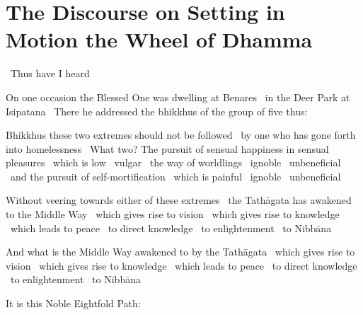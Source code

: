 \section{The Discourse on Setting in Motion the Wheel of Dhamma}
\label{wheel-of-dhamma-full}

\begin{leader-english}
  \anglebracketleft\ \hspace{-0.5mm}Thus have I heard \hspace{-0.5mm}\anglebracketright\
\end{leader-english}

\begin{english-only-hang}
  On one occasion the Blessed One was dwelling at Benares \breathmark\ in the Deer Park at Isipatana \breathmark\ There he addressed the bhikkhus of the group of five thus:
\end{english-only-hang}

\begin{english-only-hang}
  Bhikkhus these two extremes should not be followed \breathmark\ by one who has gone forth into homelessness \breathmark\ What two? The pursuit of sensual happiness in sensual pleasures \breathmark\ which is low \breathmark\ vulgar \breathmark\ the way of worldlings \breathmark\ ignoble \breathmark\ unbeneficial \breathmark\ and the pursuit of self-mortification \breathmark\ which is painful \breathmark\ ignoble \breathmark\ unbeneficial
\end{english-only-hang}

\begin{english-only-hang}
  Without veering towards either of these extremes \breathmark\ the Tathāgata has awakened to the Middle Way \breathmark\ which gives rise to vision \breathmark\ which gives rise to knowledge \breathmark\ which leads to peace \breathmark\ to direct knowledge \breathmark\ to enlightenment \breathmark\ to Nibbāna
\end{english-only-hang}

\begin{english-only-hang}
  And what is the Middle Way awakened to by the Tathāgata \breathmark\ which gives rise to vision \breathmark\ which gives rise to knowledge \breathmark\ which leads to peace \breathmark\ to direct knowledge \breathmark\ to enlightenment \breathmark\ to Nibbāna
\end{english-only-hang}

\begin{english-only-hang}
  It is this Noble Eightfold Path:
\end{english-only-hang}

